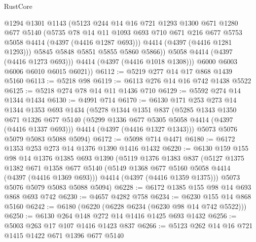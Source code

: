 \begin{lexlean}{RustCore}
\begin{coremodule}
                @1294
                @1301
                @1143
                (@5123
                  @244
                  @14
                  @16
                  @721
                  @1293
                  @1300
                  @671
                  @1280
                  @677
                  @5140
                  (@5735
                    @78
                    @14
                    @11
                    @1093
                    @693
                    @710
                    @671
                    @216
                    @677
                    @5753
                    @5058
                    @4414
                    (@4397 (@4416 @1287 @693)))
                  @4414
                  (@4397 (@4416 @1281 @1293)))
                @5845
                @5848
                @5851
                @5855
                @5860
                @5866))
            @5058
            @4414
            (@4397 (@4416 @1273 @693)))
          @4414
          (@4397 (@4416 @1018 @1308)))
        @6000
        @6003
        @6006
        @6010
        @6015
        @6021))
@6112 := @5219 @277 @14 @17 @868 @1439 @5160
@6113 := @5218 @98
@6119 := @6113 @276 @14 @16 @742 @1438 @5522
@6125 := @5218 @274 @78 @14 @11 @1436 @710
@6129 := @5592 @274 @14 @1344 @1434
@6130 := @4991 @714
@6170 := @6130
    @171
    @253
    @273
    @14
    @1344
    @1353
    @693
    @1434
    (@5278
      @1344
      @1351
      @837
      (@5285
        @1343
        @1350
        @671
        @1326
        @677
        @5140
        (@5299 @1336 @677 @5305 @5058 @4414 (@4397 (@4416 @1337 @693)))
        @4414
        (@4397 (@4416 @1327 @1343)))
      @5073
      @5076
      @5079
      @5083
      @5088
      @5094)
@6172 := @5098 @714 @4471
@6180 := @6172 @1353 @253 @273 @14 @1376 @1390 @1416 @1432
@6220 := @6130
    @159
    @155
    @98
    @14
    @1376
    @1385
    @693
    @1390
    (@5119
      @1376
      @1383
      @837
      (@5127
        @1375
        @1382
        @671
        @1358
        @677
        @5140
        (@5149 @1368 @677 @5160 @5058 @4414 (@4397 (@4416 @1369 @693)))
        @4414
        (@4397 (@4416 @1359 @1375)))
      @5073
      @5076
      @5079
      @5083
      @5088
      @5094)
@6228 := @6172 @1385 @155 @98 @14 @693 @868 @693 @742
@6230 := @4657 @4282 @758
@6234 := @6230 @155 @14 @868 @5160
@6242 := @6180 (@6220 (@6228 @6234 (@6230 @98 @14 @742 @5522)))
@6250 := @6130 @264 @148 @272 @14 @1416 @1425 @693 @1432
@6256 := @5003 @263 @17 @107 @1416 @1423 @837
@6266 := @5123 @262 @14 @16 @721 @1415 @1422 @671 @1396 @677 @5140

\end{coremodule}
\end{lexlean}
